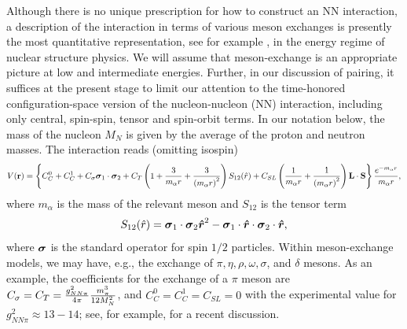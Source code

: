 \documentclass[rmp,aps,floatfix]{revtex4}
\begin{document}
Although there is no unique prescription for how to construct
an NN interaction, a description
of the interaction in terms of various meson exchanges is presently
the most quantitative representation, see for example  
\cite{mach89,v18,nijmegen94,cdbonn96,bonn-cd},
in the energy regime of nuclear structure physics.
We will assume that meson-exchange is an appropriate picture at low
and intermediate energies. Further, 
in our discussion of pairing, it suffices at the present stage
to limit our attention to the time-honored 
configuration-space version of the nucleon-nucleon (NN) interaction,
including only central, spin-spin, tensor and spin-orbit terms.
In our notation below, the mass of the nucleon $M_N$
is given by the average of the proton and neutron masses.
The interaction reads (omitting isospin)
\begin{equation}
V({\bf r})= \left\{ C^0_C + C^1_C + C_\sigma 
          \mbox{\boldmath $\sigma$}_1\cdot\mbox{\boldmath $\sigma$}_2
         + C_T \left( 1 + {3\over m_\alpha r} + {3\over
         \left(m_\alpha r\right)^2}\right) S_{12} (\hat r)+ 
         C_{SL} \left( {1\over m_\alpha r} + 
         {1\over \left( m_\alpha r\right)^2}\right) {\bf L}\cdot {\bf S}\right\} \frac{e^{-m_\alpha r}}{m_\alpha r},
       \label{eq:simpleNNv_sec2}
\end{equation}
where $m_{\alpha}$ is the mass of the relevant meson and
$S_{12}$ is the tensor term
\begin{equation}
   S_{12} (\hat r) = \mbox{\boldmath $\sigma$}_1
                      \cdot\mbox{\boldmath $\sigma$}_2
                      \mbox{\boldmath $\hat r$}^2
                      -\mbox{\boldmath $\sigma$}_1\cdot
                       \mbox{\boldmath $\hat r$}
                     \cdot\mbox{\boldmath $\sigma$}_2
                     \cdot \mbox{\boldmath $\hat r$},
\end{equation}
where $\mbox{\boldmath $\sigma$}$ is 
the standard operator for spin $1/2$
particles.
Within
meson-exchange models,  
we may have, e.g., the
exchange of $\pi , \eta , \rho , \omega , \sigma$, and $\delta$ mesons.
As an example, the coefficients for the
exchange of a $\pi$ meson are 
$C_\sigma =C_T = {g_{NN\pi}^2\over 4\pi}\frac{m^3_{\pi}}{12M_N^2}$, 
and
$C^0_C = C^1_C = C_{SL} = 0$
with the experimental value for $g_{NN\pi}^2\approx 13-14$; see, for example,
\cite{bonn-cd} for a recent discussion. 
\end{document}
